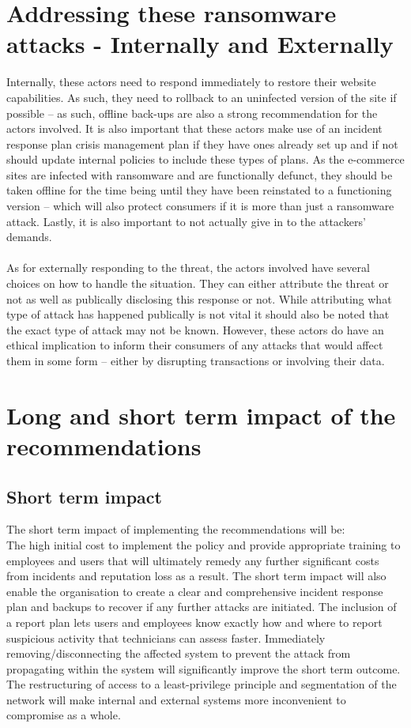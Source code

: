\documentclass[conference]{IEEEtran}
\begin{document}
\section{Addressing these ransomware attacks - Internally and Externally}
Internally, these actors need to respond immediately to restore their website capabilities. As such, they need to rollback to an uninfected version of the site if possible – as such, offline back-ups are also a strong recommendation for the actors involved. It is also important that these actors make use of an incident response plan crisis management plan if they have ones already set up and if not should update internal policies to include these types of plans. As the e-commerce sites are infected with ransomware and are functionally defunct, they should be taken offline for the time being until they have been reinstated to a functioning version – which will also protect consumers if it is more than just a ransomware attack. Lastly, it is also important to not actually give in to the attackers' demands.\\\\
As for externally responding to the threat, the actors involved have several choices on how to handle the situation. They can either attribute the threat or not as well as publically disclosing this response or not. While attributing what type of attack has happened publically is not vital it should also be noted that the exact type of attack may not be known. However, these actors do have an ethical implication to inform their consumers of any attacks that would affect them in some form – either by disrupting transactions or involving their data.
\section{Long and short term impact of the recommendations}
\subsection{Short term impact}
The short term impact of implementing the recommendations will be:\\
The high initial cost to implement the policy and provide appropriate training to employees and users that will ultimately remedy any further significant costs from incidents and reputation loss as a result. The short term impact will also enable the organisation to create a clear and comprehensive incident response plan and backups to recover if any further attacks are initiated. The inclusion of a report plan lets users and employees know exactly how and where to report suspicious activity that technicians can assess faster. Immediately removing/disconnecting the affected system to prevent the attack from propagating within the system will significantly improve the short term outcome. The restructuring of access to a least-privilege principle and segmentation of the network will make internal and external systems more inconvenient to compromise as a whole.
\end{document}
